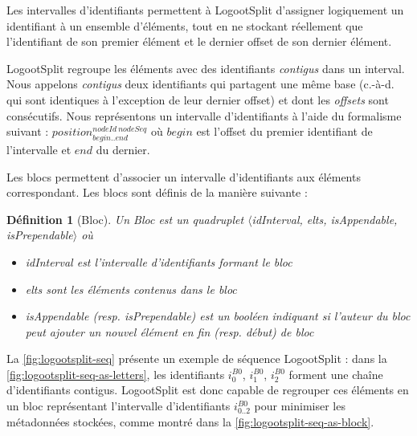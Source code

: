\documentclass[12pt]{thesul}
\newtheorem{definition}{Définition}
\newcommand{\ie}{c.-à-d. }
\newcommand{\trm}[1]{\mathit{#1}}
\newcommand{\id}[3]{$\trm{#1}^{\trm{#2}}_{\trm{#3}}$}
\begin{document}
Les intervalles d'identifiants permettent à LogootSplit d'assigner logiquement un identifiant à un ensemble d'éléments, tout en ne stockant réellement que l'identifiant de son premier élément et le dernier offset de son dernier élément.

LogootSplit regroupe les éléments avec des identifiants \emph{contigus} dans un interval.
Nous appelons \emph{contigus} deux identifiants qui partagent une même base (\ie qui sont identiques à l'exception de leur dernier offset) et dont les \emph{offsets} sont consécutifs.
Nous représentons un intervalle d'identifiants à l'aide du formalisme suivant : \id{position}{nodeId~nodeSeq}{begin..end} où $\trm{begin}$ est l'offset du premier identifiant de l'intervalle et $\trm{end}$ du dernier.

Les blocs permettent d'associer un intervalle d'identifiants aux éléments correspondant.
Les blocs sont définis de la manière suivante :

\begin{definition}[Bloc]
  Un \emph{Bloc} est un quadruplet $\langle$idInterval, elts, isAppendable, isPrependable$\rangle$ où
  \begin{itemize}
    \item idInterval est l'intervalle d'identifiants formant le bloc
    \item elts sont les éléments contenus dans le bloc
    \item isAppendable (resp. isPrependable) est un booléen indiquant si l'auteur du bloc peut ajouter un nouvel élément en fin (resp. début) de bloc
  \end{itemize}
\end{definition}

La \autoref{fig:logootsplit-seq} présente un exemple de séquence LogootSplit : dans la \autoref{fig:logootsplit-seq-as-letters}, les identifiants \id{i}{B0}{0}, \id{i}{B0}{1}, \id{i}{B0}{2} forment une chaîne d'identifiants contigus.
LogootSplit est donc capable de regrouper ces éléments en un bloc représentant l'intervalle d'identifiants \id{i}{B0}{0..2} pour minimiser les métadonnées stockées, comme montré dans la \autoref{fig:logootsplit-seq-as-block}.
\end{document}
